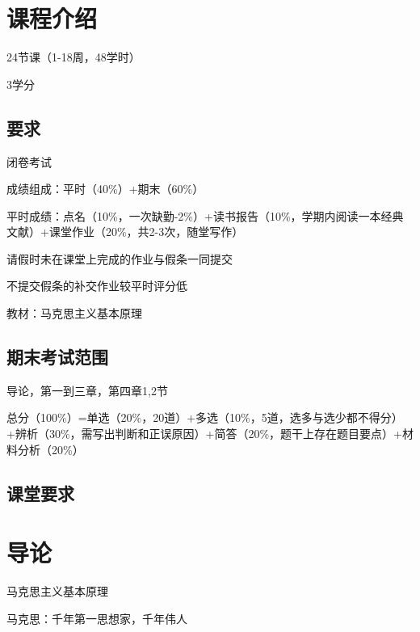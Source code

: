 \def\lecturer{李家丽}
\def\noter{THF}
\def\className{Marxism Basic Principle}
\def\term{III-B}



\maketitle
\tableofcontents
\section*{课程介绍}%
\label{subsub:课程介绍}
24节课（1-18周，48学时）

3学分

\subsection*{要求}%
\label{sub:要求}
闭卷考试

成绩组成：平时（40\%）+期末（60\%）

平时成绩：点名（10\%，一次缺勤-2\%）+读书报告（10\%，学期内阅读一本经典文献）+课堂作业（20\%，共2-3次，随堂写作）

请假时未在课堂上完成的作业与假条一同提交

不提交假条的补交作业较平时评分低

教材：马克思主义基本原理

\subsection*{期末考试范围}%
\label{sub:期末考试范围}
导论，第一到三章，第四章1,2节

总分（100\%）=单选（20\%，20道）+多选（10\%，5道，选多与选少都不得分）+辨析（30\%，需写出判断和正误原因）+简答（20\%，题干上存在题目要点）+材料分析（20\%）
\subsection*{课堂要求}%
\label{sub:课堂要求}

\section{导论}%
\label{sec:导论}
马克思主义基本原理

马克思：千年第一思想家，千年伟人
